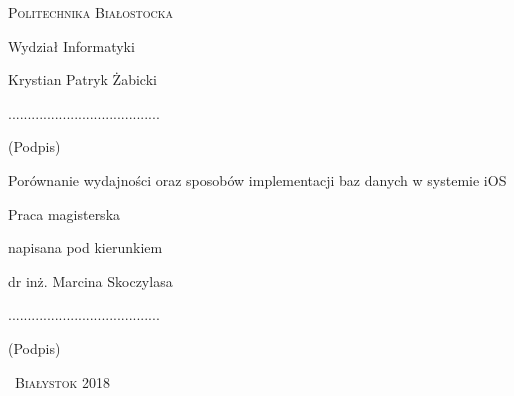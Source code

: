 \begin{titlepage}
	
	\begin{center}
		{\scshape 
			{\large Politechnika Białostocka}\par
			\vspace{0.5cm}
			{\large Wydział Informatyki}\par
			\vfill
			{\large Krystian Patryk Żabicki}\par
			\vspace{0.4cm}
			.......................................\\
			\begin{small}
				\vspace{-0.2cm}
				(Podpis)  
			\end{small}\par	
			\vspace{2cm}
			{\LARGE
				Porównanie wydajności oraz sposobów implementacji baz danych w systemie iOS
				\par
			}
			\vspace{4cm}
		}
		\begin{flushright}
			{\large
				Praca magisterska\par
				napisana pod kierunkiem\par
				dr inż. Marcina Skoczylasa\par
				\vspace{0.4cm}
				.......................................\\
				\begin{small}
					\vspace{-0.2cm}
					(Podpis)\hspace{1.63cm}    
				\end{small}				   
			}
		\end{flushright}
		\vfill
		{\scshape\large\ Białystok 2018}
	\end{center}
	
	
\end{titlepage}
